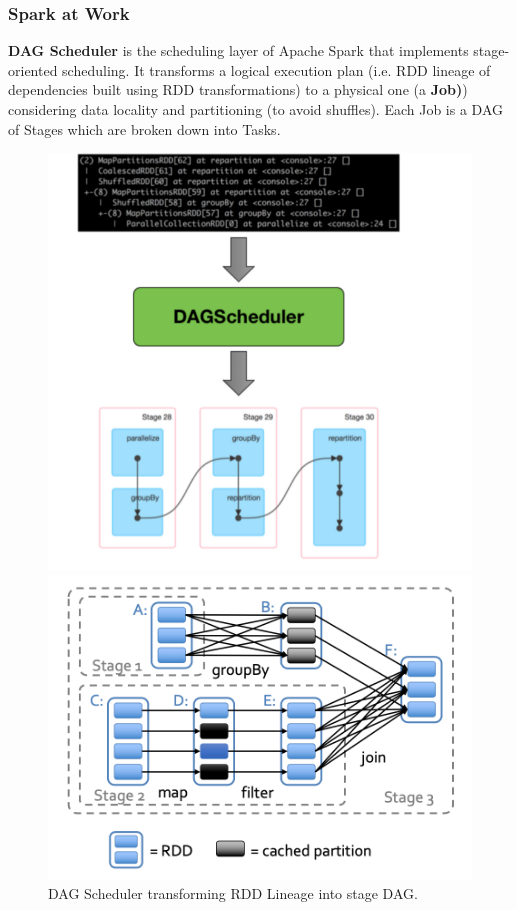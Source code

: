 \documentclass[10pt,a4paper]{article}
\begin{document}
 \subsubsection{Spark at Work}
 \textbf{DAG Scheduler} is the scheduling layer of Apache Spark that implements stage-oriented scheduling. It transforms a logical execution plan (i.e. RDD lineage of dependencies built using RDD transformations) to a physical one (a \textbf{Job)}) considering data locality and partitioning (to avoid shuffles). Each Job is a DAG of Stages which are broken down into Tasks.
 \begin{figure}[ht!]
\begin{minipage}{.5\textwidth}
  \centering
  \includegraphics[width=.8\linewidth]{images/spark-dag-scheduler}
\end{minipage}%
\begin{minipage}{.5\textwidth}
  \centering
  \includegraphics[width=.8\linewidth]{images/spark-stages}
\end{minipage}
\caption{DAG Scheduler transforming RDD Lineage into stage DAG.}
\end{figure}  \\
\end{document}
